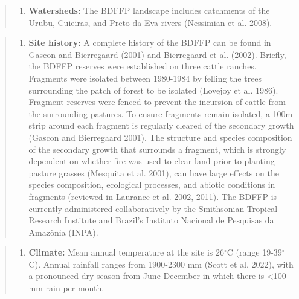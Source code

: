 \documentclass[
  12pt,
  man, donotrepeattitle]{apa6}
\providecommand{\tightlist}{%
  \setlength{\itemsep}{0pt}\setlength{\parskip}{0pt}}
\begin{document}
\begin{quote}
\begin{enumerate}
\def\labelenumi{\alph{enumi}.}
\setcounter{enumi}{4}
\tightlist
\item
  \textbf{Watersheds:} The BDFFP landscape includes catchments of the Urubu, Cuieiras, and Preto da Eva rivers (Nessimian et al. 2008).
\end{enumerate}
\end{quote}

\begin{quote}
\begin{enumerate}
\def\labelenumi{\alph{enumi}.}
\setcounter{enumi}{5}
\tightlist
\item
  \textbf{Site history:} A complete history of the BDFFP can be found in Gascon and Bierregaard (2001) and Bierregaard et al. (2002). Briefly, the BDFFP reserves were established on three cattle ranches. Fragments were isolated between 1980-1984 by felling the trees surrounding the patch of forest to be isolated (Lovejoy et al. 1986). Fragment reserves were fenced to prevent the incursion of cattle from the surrounding pastures. To ensure fragments remain isolated, a 100m strip around each fragment is regularly cleared of the secondary growth (Gascon and Bierregaard 2001). The structure and species composition of the secondary growth that surrounds a fragment, which is strongly dependent on whether fire was used to clear land prior to planting pasture grasses (Mesquita et al. 2001), can have large effects on the species composition, ecological processes, and abiotic conditions in fragments (reviewed in Laurance et al. 2002, 2011). The BDFFP is currently administered collaboratively by the Smithsonian Tropical Research Institute and Brazil's Instituto Nacional de Pesquisas da Amazônia (INPA).
\end{enumerate}
\end{quote}

\begin{quote}
\begin{enumerate}
\def\labelenumi{\alph{enumi}.}
\setcounter{enumi}{6}
\tightlist
\item
  \textbf{Climate:} Mean annual temperature at the site is 26\(^\circ\)C (range 19-39\(^\circ\)C). Annual rainfall ranges from 1900-2300 mm (Scott et al. 2022), with a pronounced dry season from June-December in which there is \textless100 mm rain per month.
\end{enumerate}
\end{quote}
\end{document}
